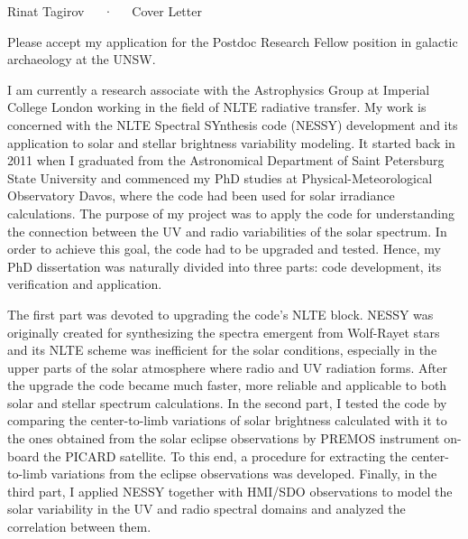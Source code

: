 \documentclass[11pt, a4paper]{awesome-cv}
\begin{document}

\makecvfooter
  {}
  {Rinat Tagirov~~~·~~~Cover Letter}
  {}

\makelettertitle

\begin{cvletter}

Please accept my application for the Postdoc Research Fellow position in galactic archaeology at the UNSW.

I am currently a research associate with the Astrophysics Group at Imperial College London
working in the field of NLTE radiative transfer.
My work is concerned with the NLTE Spectral SYnthesis code (NESSY) development and its application to
solar and stellar brightness variability modeling.
It started back in 2011 when I graduated from the Astronomical Department of Saint Petersburg State University
and commenced my PhD studies at Physical-Meteorological Observatory Davos,
where the code had been used for solar irradiance calculations.
The purpose of my project was to apply the code for understanding the connection between the UV and radio variabilities of the solar spectrum.
In order to achieve this goal, the code had to be upgraded and tested.
Hence, my PhD dissertation was naturally divided into three parts: code development, its verification and application.

The first part was devoted to upgrading the code's NLTE block.
NESSY was originally created for synthesizing the spectra emergent from Wolf-Rayet stars and its NLTE scheme
was inefficient for the solar conditions, especially in the upper parts of the solar atmosphere
where radio and UV radiation forms. After the upgrade the code became much faster, more reliable 
and applicable to both solar and stellar spectrum calculations.
In the second part, I tested the code by comparing the center-to-limb variations of solar brightness calculated with it
to the ones obtained from the solar eclipse observations by PREMOS instrument on-board the PICARD satellite.
To this end, a procedure for extracting the center-to-limb variations from the eclipse observations was developed.
Finally, in the third part, I applied NESSY together with HMI/SDO observations to model the solar variability in the UV and radio
spectral domains and analyzed the correlation between them.


\end{cvletter}
\end{document}
